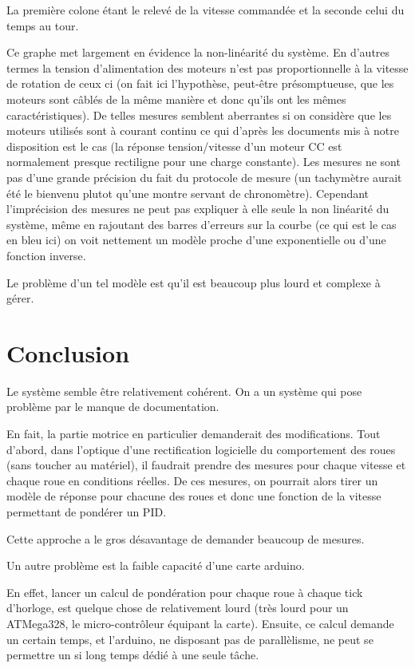 \documentclass[a4paper]{report}
\begin{document}
La première colone étant le relevé de la vitesse commandée et la seconde celui du temps au tour.

Ce graphe met largement en évidence la non-linéarité du système.
En d'autres termes la tension d'alimentation des moteurs n'est pas proportionnelle à la vitesse de rotation de ceux ci (on fait ici l'hypothèse, peut-être présomptueuse, que les moteurs sont câblés de la même manière et donc qu'ils ont les mêmes caractéristiques).
De telles mesures semblent aberrantes si on considère que les moteurs utilisés sont à courant continu ce qui d'après les documents mis à notre disposition est le cas (la réponse tension/vitesse d'un moteur CC est normalement presque rectiligne pour une charge constante).
Les mesures ne sont pas d'une grande précision du fait du protocole de mesure (un tachymètre aurait été le bienvenu plutot qu'une montre servant de chronomètre).
Cependant l'imprécision des mesures ne peut pas expliquer à elle seule la non linéarité du système, même en rajoutant des barres d'erreurs sur la courbe (ce qui est le cas en bleu ici) on voit nettement un modèle proche d'une exponentielle ou d'une fonction inverse.

Le problème d'un tel modèle est qu'il est beaucoup plus lourd et complexe à gérer.

\newpage
\section{Conclusion%
  \label{conclusion}%
}

Le système semble être relativement cohérent.
On a un système qui pose problème par le manque de documentation.

En fait, la partie motrice en particulier demanderait des modifications.
Tout d'abord, dans l'optique d'une rectification logicielle du comportement des roues (sans toucher au matériel), il faudrait prendre des mesures pour chaque vitesse et chaque roue en conditions réelles.
De ces mesures, on pourrait alors tirer un modèle de réponse pour chacune des roues et donc une fonction de la vitesse permettant de pondérer un PID.

Cette approche a le gros désavantage de demander beaucoup de mesures.

Un autre problème est la faible capacité d'une carte arduino.

En effet, lancer un calcul de pondération pour chaque roue à chaque tick d'horloge, est quelque chose de relativement lourd (très lourd pour un ATMega328, le micro-contrôleur équipant la carte).
Ensuite, ce calcul demande un certain temps, et l'arduino, ne disposant pas de parallèlisme, ne peut se permettre un si long temps dédié à une seule tâche.
\end{document}
